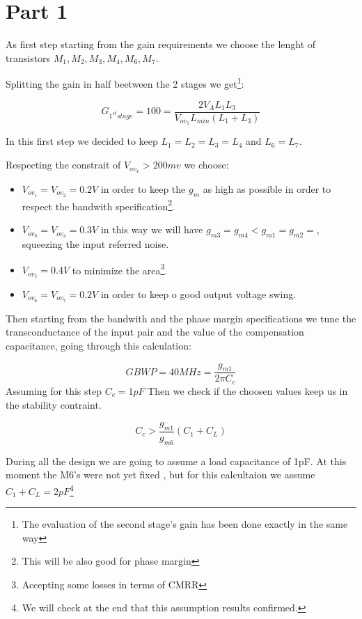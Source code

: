 \chapter{Part 1} %
\label{cha:part_1}


As first step starting from the gain requirements we choose the lenght of transistors $M_1,M_2,M_3,M_4,M_6,M_7.$

Splitting the gain in half beetween the 2 stages we get\footnote{The evaluation of the second stage's gain has been done exactly in the same way}:

\begin{equation}
	G_{1^{st} stage} = 100 = \frac{2V_AL_1L_3}{V_{ov_1}L_{min}(L_1+L_3)}
\end{equation}


In this first step we decided to keep $L_1=L_2=L_3=L_4$ and $L_6=L_7$.

Respecting the constrait of $V_{ov_x} > 200mv$ we choose:

\begin{itemize}
	\item $V_{ov_1}=V_{ov_2}= 0.2V$ in order to keep the $g_m$ as high as possible in order to respect the bandwith specification\footnote{This will be also good for phase margin}.
	\item $V_{ov_3}=V_{ov_4}= 0.3V$ in this way we will have $g_{m3}=g_{m4}<g_{m1}=g_{m2}=$, squeezing the input referred noise.
	\item $V_{ov_5}= 0.4V$ to minimize the area\footnote{Accepting some losses in terms of CMRR}.
	\item $V_{ov_6}=V_{ov_7}= 0.2V$ in order to keep o good output voltage swing. 
\end{itemize}

Then starting from the bandwith and the phase margin specifications we tune the transconductance of the input pair and the value of the compensation capacitance, going through this calculation:

\begin{equation}
	GBWP=40MHz=\frac{g_{m1}}{2 \pi C_c}
\end{equation}
Assuming for this step $C_c = 1pF$
Then we check if the choosen values keep us in the stability contraint.

\begin{equation}
	C_c> \frac{g_{m1}}{g_{m6}}(C_1+C_L)
\end{equation}

During all the design we are going to assume a load capacitance of 1pF.
At this moment the M6's were not yet fixed , but for this calcultaion we assume $C_1+C_L=2pF$\footnote{We will check at the end that this assumption results confirmed.}

